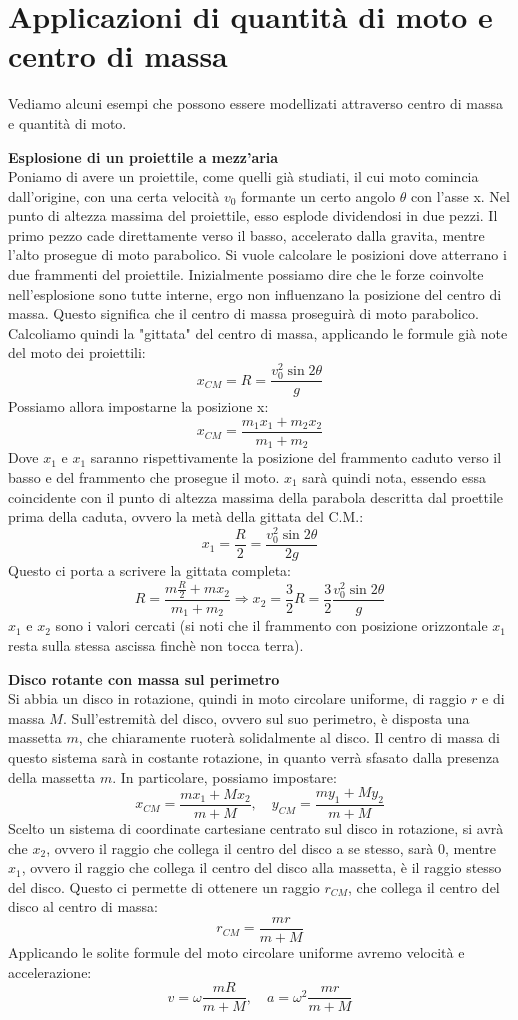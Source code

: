 \documentclass[a4paper,12pt]{article}
\begin{document}
\section{Applicazioni di quantità di moto e centro di massa}
Vediamo alcuni esempi che possono essere modellizati attraverso centro di massa e quantità di moto.
\par\smallskip
\textbf{Esplosione di un proiettile a mezz'aria} \\
Poniamo di avere un proiettile, come quelli già studiati, il cui moto comincia dall'origine, con una certa velocità $v_0$
formante un certo angolo $\theta$ con l'asse x. Nel punto di altezza massima del proiettile, esso esplode dividendosi in due pezzi.
Il primo pezzo cade direttamente verso il basso, accelerato dalla gravita, mentre l'alto prosegue di moto parabolico. Si vuole
calcolare le posizioni dove atterrano i due frammenti del proiettile. Inizialmente possiamo dire che le forze coinvolte nell'esplosione
sono tutte interne, ergo non influenzano la posizione del centro di massa. Questo significa che il centro di massa proseguirà di moto
parabolico. Calcoliamo quindi la "gittata" del centro di massa, applicando le formule già note del moto dei proiettili:
$$ x_{CM} = R = \frac{v_0^2\sin{2\theta}}{g} $$
Possiamo allora impostarne la posizione x:
$$ x_{CM} = \frac{m_1x_1 + m_2x_2}{m_1+m_2} $$
Dove $x_1$ e $x_1$ saranno rispettivamente la posizione del frammento caduto verso il basso e del frammento che prosegue il moto.
$x_1$ sarà quindi nota, essendo essa coincidente con il punto di altezza massima della parabola descritta dal proettile prima della
caduta, ovvero la metà della gittata del C.M.:
$$ x_1 = \frac{R}{2} = \frac{v_0^2\sin{2\theta}}{2g} $$
Questo ci porta a scrivere la gittata completa:
$$ R = \frac{m\frac{R}{2} + mx_2}{m_1+m_2} \Rightarrow x_2 = \frac{3}{2}R = \frac{3}{2}\frac{v_0^2\sin{2\theta}}{g}$$
$x_1$ e $x_2$ sono i valori cercati (si noti che il frammento con posizione orizzontale $x_1$ resta sulla stessa ascissa finchè non
tocca terra).
\par\smallskip
\textbf{Disco rotante con massa sul perimetro} \\
Si abbia un disco in rotazione, quindi in moto circolare uniforme, di raggio $r$ e di massa $M$. Sull'estremità del disco, ovvero
sul suo perimetro, è disposta una massetta $m$, che chiaramente ruoterà solidalmente al disco. Il centro di massa di questo sistema
sarà in costante rotazione, in quanto verrà sfasato dalla presenza della massetta $m$. In particolare, possiamo impostare:
$$ x_{CM} = \frac{mx_1 + Mx_2}{m+M}, \quad y_{CM} = \frac{my_1 + My_2}{m+M} $$
Scelto un sistema di coordinate cartesiane centrato sul disco in rotazione, si avrà che $x_2$, ovvero il raggio che collega
il centro del disco a se stesso, sarà 0, mentre $x_1$, ovvero il raggio che collega il centro del disco alla massetta, è il raggio
stesso del disco. Questo ci permette di ottenere un raggio $r_{CM}$, che collega il centro del disco al centro di massa:
$$ r_{CM} = \frac{mr}{m+M} $$
Applicando le solite formule del moto circolare uniforme avremo velocità e accelerazione:
$$ v = \omega \frac{mR}{m+M}, \quad a = \omega^2 \frac{mr}{m+M} $$
\end{document}
